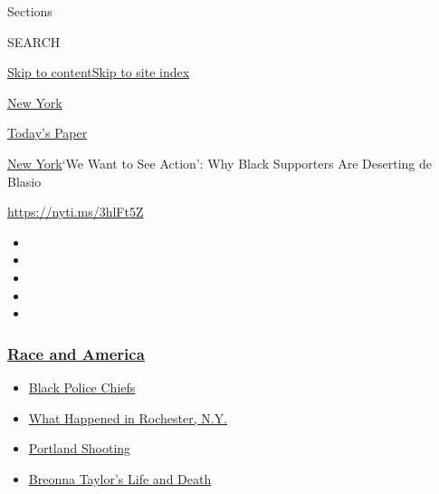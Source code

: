Sections

SEARCH

\protect\hyperlink{site-content}{Skip to
content}\protect\hyperlink{site-index}{Skip to site index}

\href{https://www.nytimes3xbfgragh.onion/section/nyregion}{New York}

\href{https://myaccount.nytimes3xbfgragh.onion/auth/login?response_type=cookie\&client_id=vi}{}

\href{https://www.nytimes3xbfgragh.onion/section/todayspaper}{Today's
Paper}

\href{/section/nyregion}{New York}\textbar{}`We Want to See Action': Why
Black Supporters Are Deserting de Blasio

\url{https://nyti.ms/3hlFt5Z}

\begin{itemize}
\item
\item
\item
\item
\item
\end{itemize}

\hypertarget{race-and-america}{%
\subsubsection{\texorpdfstring{\href{https://www.nytimes3xbfgragh.onion/news-event/george-floyd-protests-minneapolis-new-york-los-angeles?name=styln-george-floyd\&region=TOP_BANNER\&block=storyline_menu_recirc\&action=click\&pgtype=Article\&impression_id=4dfaf4b0-f4bd-11ea-a63b-a9cd07fa0b5c\&variant=undefined}{Race
and America}}{Race and America}}\label{race-and-america}}

\begin{itemize}
\tightlist
\item
  \href{https://www.nytimes3xbfgragh.onion/2020/09/11/us/black-police-chiefs-reform.html?name=styln-george-floyd\&region=TOP_BANNER\&block=storyline_menu_recirc\&action=click\&pgtype=Article\&impression_id=4dfaf4b1-f4bd-11ea-a63b-a9cd07fa0b5c\&variant=undefined}{Black
  Police Chiefs}
\item
  \href{https://www.nytimes3xbfgragh.onion/2020/09/04/nyregion/rochester-police-daniel-prude.html?name=styln-george-floyd\&region=TOP_BANNER\&block=storyline_menu_recirc\&action=click\&pgtype=Article\&impression_id=4dfb1bc0-f4bd-11ea-a63b-a9cd07fa0b5c\&variant=undefined}{What
  Happened in Rochester, N.Y.}
\item
  \href{https://www.nytimes3xbfgragh.onion/2020/08/30/us/portland-shooting-explained.html?name=styln-george-floyd\&region=TOP_BANNER\&block=storyline_menu_recirc\&action=click\&pgtype=Article\&impression_id=4dfb1bc1-f4bd-11ea-a63b-a9cd07fa0b5c\&variant=undefined}{Portland
  Shooting}
\item
  \href{https://www.nytimes3xbfgragh.onion/2020/08/30/us/breonna-taylor-police-killing.html?name=styln-george-floyd\&region=TOP_BANNER\&block=storyline_menu_recirc\&action=click\&pgtype=Article\&impression_id=4dfb1bc2-f4bd-11ea-a63b-a9cd07fa0b5c\&variant=undefined}{Breonna
  Taylor's Life and Death}
\end{itemize}

